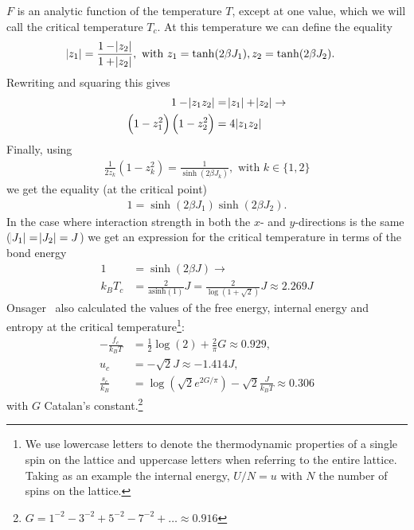\documentclass[11pt, a4paper]{report} %
\begin{document}
\(F\) is an analytic function of the temperature \(T\), except at one value, which we will call the critical temperature \(T_c\). At this temperature we can define the equality~\cite{mccoy:1973}
\begin{align}
	\abs{z_1} &= \frac{1 - \abs{z_2}}{1+ \abs{z_2}}, \text{ with } z_1 = \tanh(2\beta J_1), z_2 = \tanh(2\beta J_2).
\end{align}
Rewriting and squaring this gives
\begin{align}
	\label{eq:ising_z_functions}
	1 - \abs{z_1 z_2} &= \abs{z_1} + \abs{z_2}\rightarrow\\
	\left(1 - z_1^2 \right) \left(1 - z_2^2 \right) &= 4 \abs{z_1 z_2}
\end{align}
Finally, using
\begin{align}
	\frac{1}{2 z_k}\left(1 - z_k^2\right) = \frac{1}{\sinh(2 \beta J_k)}, \text{ with } k \in \{{1, 2}\}
\end{align}
we get the equality (at the critical point)
\begin{align}
	1 = \sinh(2\beta J_1) \sinh(2\beta J_2).
\end{align}
In the case where interaction strength in both the \(x\)- and \(y\)-directions is the same (\(\abs{J_1} = \abs{J_2} = J\)) we get an expression for the critical temperature in terms of the bond energy
\begin{align}
	1 &= \sinh(2\beta J) \to \\
	k_B T_c &= \frac{2}{\text{asinh}(1)}J = \frac{2}{\log(1+\sqrt{2})}J \approx 2.269 J
\end{align}
Onsager~\cite{onsager:1944} also calculated the values of the free energy, internal energy and entropy at the critical temperature\footnote{We use lowercase letters to denote the thermodynamic properties of a single spin on the lattice and uppercase letters when referring to the entire lattice. Taking as an example the internal energy, \(U/N = u\) with \(N\) the number of spins on the lattice.}:
\begin{align}
	-\frac{f_c}{k_B T} &= \frac{1}{2} \log(2) + \frac{2}{\pi} G \approx 0.929, \\
	u_c &= - \sqrt{2} J \approx - 1.414 J,\\
	\frac{s_c}{k_B} &= \log{(\sqrt{2} e^{2G/\pi})} - \sqrt{2} \frac{J}{k_B T} \approx 0.306
\end{align}
with \(G\) Catalan's constant.\footnote{\(G = 1^{-2} - 3^{-2} + 5^{-2} - 7^{-2} +\ldots \approx 0.916\)}
\end{document}
